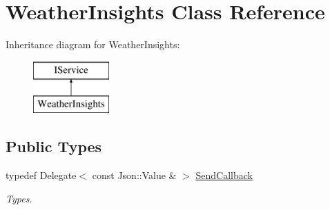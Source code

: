 \hypertarget{class_weather_insights}{}\section{Weather\+Insights Class Reference}
\label{class_weather_insights}
Inheritance diagram for Weather\+Insights\+:\begin{figure}[H]
\begin{center}
\leavevmode
\includegraphics[height=2.000000cm]{class_weather_insights}
\end{center}
\end{figure}
\subsection*{Public Types}
\begin{DoxyCompactItemize}
\item 
\mbox{\label{class_weather_insights_a65ee20ca4986e83a6de60b1f2a4e36ac}} 
typedef Delegate$<$ const Json\+::\+Value \& $>$ \hyperlink{class_weather_insights_a65ee20ca4986e83a6de60b1f2a4e36ac}{Send\+Callback}
\begin{DoxyCompactList}\small\item\em Types. \end{DoxyCompactList}\end{DoxyCompactItemize}
